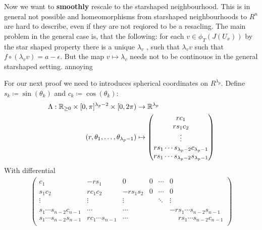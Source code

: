 Now we want to \textbf{smoothly} rescale to the starshaped neighbourhood. This is in general not possible and homeomorphisms from starshaped neighbourhoods to $R^n$ are hard to describe, even if they are not reqiored to be a resacling. The main problem in the general case is, that the following: for each $v\in \phi_T(J(U_x))$ by the star shaped property there is a unique $\lambda_v$ , such that $\lambda_v v$ such that $f\circ (\lambda_v v)=a-\epsilon$. But the map $v\mapsto \lambda_v$ needs not to be continouos in the general starshaped setting. annoying
	\begin{definition}
	For our next proof we need to introduces spherical coordinates on $R^{\lambda_{p}}$. Define $s_k\coloneq \sin(\theta_k)$ and $c_k\coloneq \cos(\theta_k)$:
	\begin{align*}
		\Lambda: \mathbb{R}_{\geq 0}\times [0,\pi]^{\lambda_{p}-2}\times [0,2\pi)&\to \mathbb{R}^{\lambda_p}  \\
		(r,\theta_1,\dots, \theta_{\lambda_p-1})&\mapsto \begin{pmatrix}
			rc_1\\
			rs_1c_2\\
			\vdots  \\
			rs_1 \cdots s_{\lambda_{p}-2} c_{\lambda_{p}-1} \\
			rs_1 \cdots s_{\lambda_{p}-2} s_{\lambda_{p}-1}		
		\end{pmatrix}
	\end{align*}
	With differential 
	\begin{align*}
		\begin{pmatrix} 
			c_1                        &-rs_1              &0        &0 &\cdots &0      \\
			s_1c_2                     &rc_1c_2            &-rs_1s_2 &0 &\cdots &0      \\
			\vdots                     &\vdots             & \vdots  &  &\ddots &\vdots \\
			&                   &         &  &             \\
			s_1\cdots s_{n-2}c_{n-1}   &\cdots             &\cdots   &  &       &-rs_1\cdots s_{n-2}s_{n-1} \\
			s_{1}\cdots s_{n-2}s_{n-1} &rc_1\cdots s_{n-1} &\cdots   &  &       &\phantom{-}rs_1\cdots s_{n-2}c_{n-1}\\
		\end{pmatrix}
	\end{align*}
	
\end{definition}

